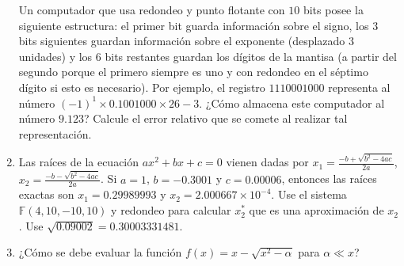\begin{frame}
\begin{enumerate}
          Un computador que usa redondeo y punto flotante con $10$
          bits posee la siguiente estructura:
          el primer bit guarda información sobre el signo, los $3$
          bits siguientes guardan información sobre el
          exponente (desplazado $3$ unidades) y los $6$ bits
          restantes guardan los dígitos de la mantisa (a partir del
          segundo porque el primero siempre es uno y con redondeo en
          el séptimo dígito si esto es necesario).
          Por ejemplo, el registro $1110001000$ representa al número
          ${\left(-1\right)}^{1}\times 0.1001000\times 2{6-3}$.
          ¿Cómo almacena este computador al número $9.123$?
          Calcule el error relativo que se comete al realizar tal
          representación.

    \item

          Las raíces de la ecuación $ax^{2}+bx+c=0$ vienen dadas por
          $x_{1}=\frac{-b+\sqrt{b^2-4ac}}{2a}$,
          $x_{2}=\frac{-b-\sqrt{b^2-4ac}}{2a}$.
          Si $a=1$, $b=-0.3001$ y $c=0.00006$, entonces las raíces
          exactas son $x_{1}=0.29989993$ y
          $x_{2}=2.000667\times{10}^{-4}$.
          Use el sistema $\mathbb{F}\left(4,10,-10,10\right)$ y
          redondeo para calcular $x^{\ast}_{2}$ que es una
          aproximación de $x_{2}$.
          Use $\sqrt{0.09002}=0.30003331481$.

    \item

          ¿Cómo se debe evaluar la función
          \begin{math}
            f\left(x\right)=
            x-
            \sqrt{x^2-\alpha}
          \end{math}
          para $\alpha\ll x$?

          \saveenum
  \end{enumerate}
\end{frame}

